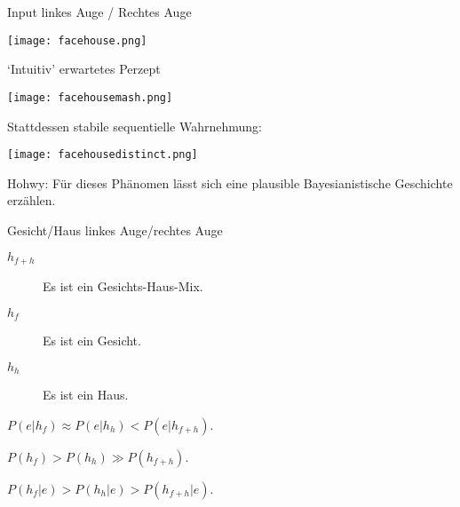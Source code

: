 \documentclass[11pt, handout]{beamer}
\begin{document}
\begin{frame}

  Input linkes Auge / Rechtes Auge

  \begin{center}
    \texttt{[image: facehouse.png]}
  \end{center}
  `Intuitiv' erwartetes Perzept

  \begin{center}
    \texttt{[image: facehousemash.png]}
  \end{center}

  Stattdessen stabile sequentielle Wahrnehmung:
  \begin{center}
    \texttt{[image: facehousedistinct.png]}
  \end{center}
\end{frame}



\begin{frame}
  \small Hohwy: Für dieses Phänomen lässt sich eine plausible
  Bayesianistische Geschichte erzählen.

  \begin{description}[<+->]
  \item[Input]
    \begin{description}[<+->]
    \item[$e$] Gesicht/Haus linkes Auge/rechtes Auge

    \end{description}
  \item[Hypothesen]
    \begin{description}
    \item[$h_{f+h}$] Es ist ein Gesichts-Haus-Mix.
    \item[$h_f$] Es ist ein Gesicht.
    \item[$h_h$] Es ist ein Haus.
    \end{description}
  \item[Likelihoods] $P(e|h_f) \approx P(e|h_h) < P(e|h_{f+h})$.
  \item[Priors] $P(h_f) > P(h_h) \gg P(h_{f+h})$.

  \end{description}

  \begin{description}[<+->]
  \item[Posteriors] $P(h_f|e) > P(h_h|e) > P(h_{f+h}|e)$.
  \end{description}

\end{frame}
\end{document}
